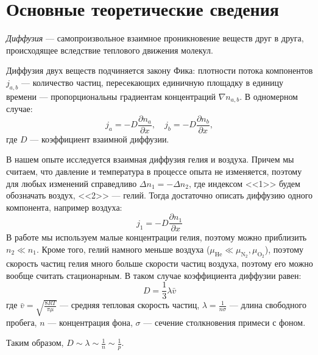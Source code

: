 \documentclass[a4paper,12pt]{report}
\begin{document}
    \section{Основные теоретические сведения}
    \begin{multicols}{2}
        \emph{Диффузия} --- самопроизвольное взаимное проникновение веществ друг в друга, происходящее вследствие теплового движения молекул.

        Диффузия двух веществ подчиняется закону Фика: плотности потока компонентов $j_{a,b}$ --- количество частиц, пересекающих единичную площадку в единицу времени --- пропорциональны градиентам концентраций $\nabla n_{a,b}$. В одномерном случае:
        \begin{equation*}
            j_a=-D\frac{\partial n_a}{\partial x}, \quad j_b=-D\frac{\partial n_b}{\partial x},
        \end{equation*}
        где $D$ --- коэффициент взаимной диффузии.

        В нашем опыте исследуется взаимная диффузия гелия и воздуха. Причем мы считаем, что давление и температура в процессе опыта не изменяется, поэтому для любых изменений справедливо $\Delta n_1=-\Delta n_2$, где индексом <<1>> будем обозначать воздух, <<2>> --- гелий. Тогда достаточно описать диффузию одного компонента, например воздуха:
        \begin{equation}
            j_1=-D\frac{\partial n_1}{\partial x}
        \end{equation}
        В работе мы используем малые концентрации гелия, поэтому можно приблизить $n_2 \ll n_1$. Кроме того, гелий намного меньше воздуха ($\mu_\text{He}\ll \mu_{\text{N}_2},\mu_{\text{O}_2}$), поэтому скорость частиц гелия много больше скорости частиц воздуха, поэтому его можно вообще считать стационарным. В таком случае коэффициента диффузии равен:
        \begin{equation}
            D=\frac{1}{3}\lambda \bar{v}
        \end{equation}
        где $\bar{v}=\sqrt{\frac{8RT}{\pi\mu}}$ --- средняя тепловая скорость частиц, $\lambda=\frac{1}{n\sigma}$ --- длина свободного пробега, $n$ --- концентрация фона, $\sigma$ --- сечение столкновения примеси с фоном.

        Таким образом, $D\sim\lambda\sim\frac{1}{n}\sim\frac{1}{p}$.
    \end{multicols}
\end{document}
